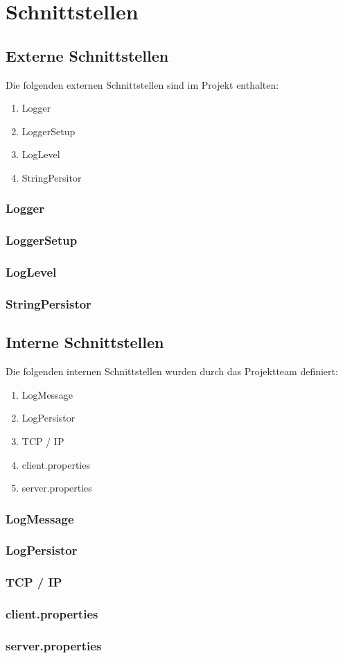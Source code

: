 \section{Schnittstellen}
\subsection{Externe Schnittstellen}
Die folgenden externen Schnittstellen sind im Projekt enthalten:
\begin{enumerate}
	\item Logger
	\item LoggerSetup
	\item LogLevel
	\item StringPersitor
\end{enumerate}

\subsubsection{Logger}
\subsubsection{LoggerSetup}
\subsubsection{LogLevel}
\subsubsection{StringPersistor}

\subsection{Interne Schnittstellen}
Die folgenden internen Schnittstellen wurden durch das Projektteam definiert: 
\begin{enumerate}
	\item LogMessage
	\item LogPersistor
	\item TCP / IP
	\item client.properties
	\item server.properties
\end{enumerate}

\subsubsection{LogMessage}
\subsubsection{LogPersistor}
\subsubsection{TCP / IP}
\subsubsection{client.properties}
\subsubsection{server.properties}